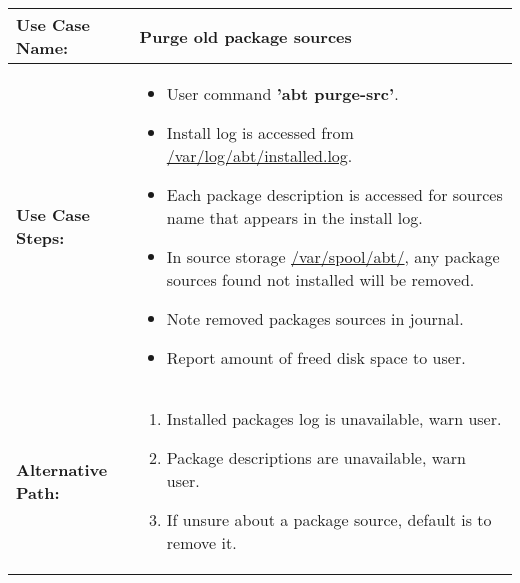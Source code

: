 \medskip

\begin{tabularx}{\linewidth}{|l|X|}
\hline
\textbf{Use Case Name:} & \textbf{Purge old package sources} \\
\hline
\textbf{Use Case Steps:} & 
\begin{minipage}{\linewidth} 
  \vspace{0.05em}
  \begin{itemize}
    \item User command \textbf{'abt purge-src'}.
    \item Install log is accessed from \url{/var/log/abt/installed.log}.
    \item Each package description is accessed for sources name that appears in the install log.
    \item In source storage \url{/var/spool/abt/}, any package sources found not installed will be removed.
    \item Note removed packages sources in journal.
    \item Report amount of freed disk space to user.
  \end{itemize}
  \vspace{0.05em}
\end{minipage}
\\
\hline 
\textbf{Alternative Path:} &
\begin{minipage}{\linewidth}
  \vspace{0.05em} 
  \begin{enumerate}
    \item Installed packages log is unavailable, warn user.
    \item Package descriptions are unavailable, warn user.
    \item If unsure about a package source, default is to remove it.
  \end{enumerate}
  \vspace{0.05em} 
\end{minipage}
\\
\hline
\end{tabularx}